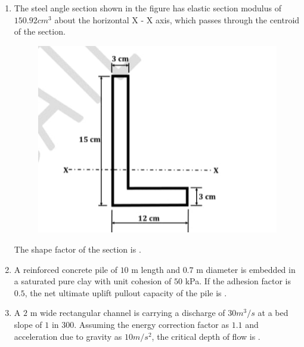 \documentclass[journal,12pt,onecolumn]{article}
\theoremstyle{remark}
\begin{document}
\begin{enumerate}
    \item The steel angle section shown in the figure  has elastic section modulus of
    $150.92 cm^3$ about the horizontal X - X axis, which passes through the centroid of
    the section.
    \begin{figure}[H]
        \centering
        \includegraphics[width=0.7\columnwidth]{figs/2Q33.jpg}
        \caption{}
        \label{fig:q33}
    \end{figure}
    
    The shape factor of the section is \underline{\hspace{2cm}} .
    
    \hfill{}
    
    \item A reinforced concrete pile of $10$ m length and $0.7$ m diameter is embedded in a
    saturated pure clay with unit cohesion of $50$ kPa. If the adhesion factor is $0.5$, the
    net ultimate uplift pullout capacity  of the pile is \underline{\hspace{2cm}}
    .
    
    \hfill{}
    
    \item A $2$ m wide rectangular channel is carrying a discharge of $30 m^3/s$ at a bed slope of
    $1$ in $300$. Assuming the energy correction factor as $1.1$ and acceleration due to
    gravity as $10 m/s^2$, the critical depth of flow  is \underline{\hspace{2cm}} .
    
    \hfill{}


\end{enumerate}
\end{document}
